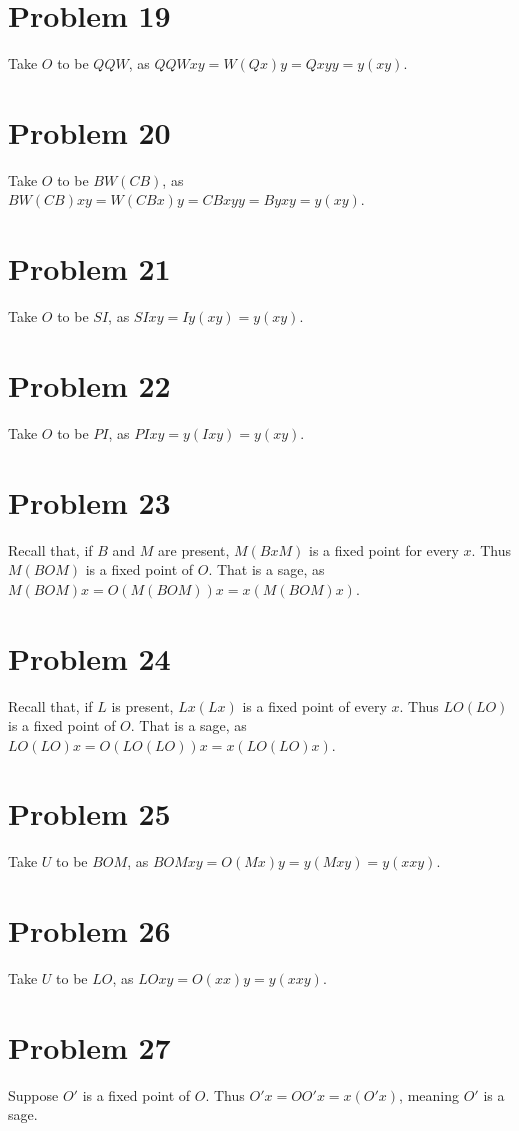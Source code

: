 \documentclass{article}
\theoremstyle{definition}
\begin{document}
\section*{Problem 19}
Take $O$ to be $QQW$, as $QQWxy=W(Qx)y=Qxyy=y(xy)$.

\section*{Problem 20}
Take $O$ to be $BW(CB)$, as $BW(CB)xy=W(CBx)y=CBxyy=Byxy=y(xy)$.

\section*{Problem 21}
Take $O$ to be $SI$, as $SIxy=Iy(xy)=y(xy)$.

\section*{Problem 22}
Take $O$ to be $PI$, as $PIxy=y(Ixy)=y(xy)$.

\section*{Problem 23}
Recall that, if $B$ and $M$ are present, $M(BxM)$ is a fixed point for every $x$. Thus $M(BOM)$ is a fixed point of $O$. That is a sage, as 
$M(BOM)x=O(M(BOM))x=x(M(BOM)x)$.

\section*{Problem 24}
Recall that, if $L$ is present, $Lx(Lx)$ is a fixed point of every $x$. Thus $LO(LO)$ is a fixed point of $O$. That is a sage, as
$LO(LO)x=O(LO(LO))x=x(LO(LO)x)$.

\section*{Problem 25}
Take $U$ to be $BOM$, as $BOMxy=O(Mx)y=y(Mxy)=y(xxy)$.

\section*{Problem 26}
Take $U$ to be $LO$, as $LOxy=O(xx)y=y(xxy)$.

\section*{Problem 27}
Suppose $O'$ is a fixed point of $O$. Thus $O'x=OO'x=x(O'x)$, meaning $O'$ is a sage.
\end{document}
